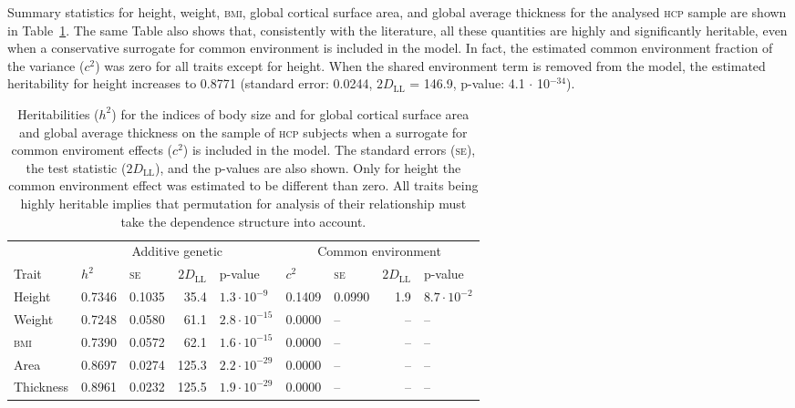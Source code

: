 Summary statistics for height, weight, \textsc{bmi}, global cortical surface area, and global average thickness for the analysed \textsc{hcp} sample are shown in Table~\ref{tab:heritabilities}. The same Table also shows that, consistently with the literature, all these quantities are highly and significantly heritable, even when a conservative surrogate for common environment is included in the model. In fact, the estimated common environment fraction of the variance ($c^2$) was zero for all traits except for height. When the shared environment term is removed from the model, the estimated heritability for height increases to 0.8771 (standard error: 0.0244, $2D_{\text{LL}}$ = 146.9, p-value: 4.1 $\cdot$ 10$^{-34}$).

\begin{table}[tbp]
\caption{Heritabilities ($h^2$) for the indices of body size and for global cortical surface area and global average thickness on the sample of \textsc{hcp} subjects when a surrogate for common enviroment effects ($c^2$) is included in the model. The standard errors (\textsc{se}), the test statistic ($2D_{\text{LL}}$), and the p-values are also shown. Only for height the common environment effect was estimated to be different than zero. All traits being highly heritable implies that permutation for analysis of their relationship must take the dependence structure into account.}
{\small
\begin{center}
\hspace*{-3mm}\begin{tabular}{@{}lllrlllrl@{}}
\toprule
{} & \multicolumn{4}{c}{Additive genetic} & \multicolumn{4}{c}{Common environment}\\
\cmidrule(lr){2-5} \cmidrule(l){6-9}
Trait & $h^2$ & \textsc{se} & $2D_{\text{LL}}$ & p-value & $c^2$ & \textsc{se} & $2D_{\text{LL}}$ & p-value\\
\midrule
Height       & 0.7346 & 0.1035 & 35.4  & $1.3 \cdot 10^{-9}$  & 0.1409 & 0.0990 & 1.9 & $8.7 \cdot 10^{-2}$\\
Weight       & 0.7248 & 0.0580 & 61.1  & $2.8 \cdot 10^{-15}$ & 0.0000 & -- & -- & --\\
\textsc{bmi} & 0.7390 & 0.0572 & 62.1  & $1.6 \cdot 10^{-15}$ & 0.0000 & -- & -- & --\\
Area         & 0.8697 & 0.0274 & 125.3 & $2.2 \cdot 10^{-29}$ & 0.0000 & -- & -- & --\\
Thickness    & 0.8961 & 0.0232 & 125.5 & $1.9 \cdot 10^{-29}$ & 0.0000 & -- & -- & --\\
\bottomrule   
\end{tabular}
\end{center}}
\label{tab:heritabilities}
\end{table}

